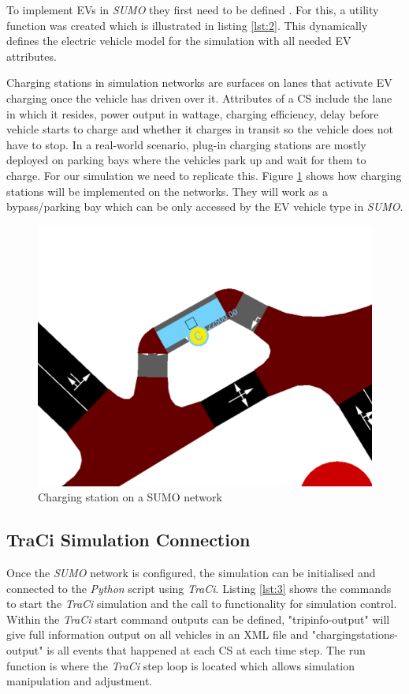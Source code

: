 \documentclass[11pt]{report}
\begin{document}
To implement EVs in \emph{SUMO} they first need to be defined \autocite{sumoElectric}. For this, a utility function was created which is illustrated in listing \ref{lst:2}. This dynamically defines the electric vehicle model for the simulation with all needed EV attributes.

Charging stations in simulation networks are surfaces on lanes that activate EV charging once the vehicle has driven over it. Attributes of a CS include the lane in which it resides, power output in wattage, charging efficiency, delay before vehicle starts to charge and whether it charges in transit so the vehicle does not have to stop. In a real-world scenario, plug-in charging stations are mostly deployed on parking bays where the vehicles park up and wait for them to charge. For our simulation we need to replicate this. Figure \ref{fig:8} shows how charging stations will be implemented on the networks. They will work as a bypass/parking bay which can be only accessed by the EV vehicle type in \emph{SUMO}.

\begin{figure}[h!]
  \centering
  \includegraphics[width=0.7\linewidth]{sumoCS.PNG}
  \caption{Charging station on a SUMO network}
  \label{fig:8}
\end{figure}

\subsection{TraCi Simulation Connection}

Once the \emph{SUMO} network is configured, the simulation can be initialised and connected to the \emph{Python} script using \emph{TraCi}. Listing \ref{lst:3} shows the commands to start the \emph{TraCi} simulation and the call to functionality for simulation control. Within the \emph{TraCi} start command outputs can be defined, "tripinfo-output" will give full information output on all vehicles in an XML file and "chargingstations-output" is all events that happened at each CS at each time step. The run function is where the \emph{TraCi} step loop is located which allows simulation manipulation and adjustment.
\end{document}
